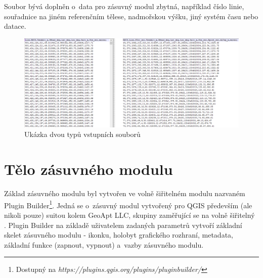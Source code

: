 Soubor bývá doplněn o~data pro zásuvný modul zbytná, například číslo linie, souřadnice na jiném
referenčním tělese, nadmořskou výšku, jiný systém času nebo datace. 

  \begin{figure}[H]
   \centering
	\includegraphics[scale=0.45]{./pictures/ukazka-vstup.png}
	\caption[Ukázka dvou typů vstupních souborů]{Ukázka dvou typů vstupních souborů
      \label{fig:ukazka-vstup}}
  \end{figure}

\section{Tělo zásuvného modulu}
\label{telo}

Základ zásuvného modulu byl vytvořen ve volně šiřitelném mo\-dulu nazvaném Plugin
Builder\footnote{Dostupný na \textit{https://plugins.qgis.org/plugins/pluginbuilder/}}. Jedná se
o~zásuvný modul vytvořený pro QGIS především (ale nikoli pouze) suitou kolem GeoApt LLC,
skupi\-ny zaměřující se na volně šiřitelný . Plugin Builder na
základě uživatelem zadaných parametrů vytvoří základní skelet zásuvného modulu - ikonku, holobyt
grafického rozhraní, metadata, základní funkce (zapnout, vypnout) a~vazby zásuvného modulu. 

